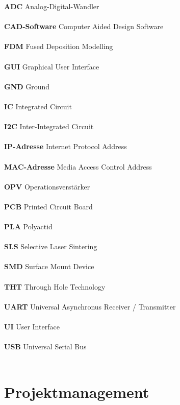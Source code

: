 \documentclass[titlepage,12pt,twoside]{article}
\begin{document}
{\large \textbf{ADC}} Analog-Digital-Wandler \\
\\
{\large \textbf{CAD-Software}} Computer Aided Design Software \\
\\
{\large \textbf{FDM}} Fused Deposition Modelling \\
\\
{\large \textbf{GUI}} Graphical User Interface \\
\\
{\large \textbf{GND}} Ground \\
\\
{\large \textbf{IC}} Integrated Circuit \\
\\
{\large \textbf{I2C}} Inter-Integrated Circuit \\
\\
{\large \textbf{IP-Adresse}} Internet Protocol Address \\
\\
{\large \textbf{MAC-Adresse}} Media Access Control Address \\
\\
{\large \textbf{OPV}} Operationsverstärker \\
\\
{\large \textbf{PCB}} Printed Circuit Board \\
\\
{\large \textbf{PLA}} Polyactid \\
\\
{\large \textbf{SLS}} Selective Laser Sintering \\
\\
{\large \textbf{SMD}} Surface Mount Device \\
\\
{\large \textbf{THT}} Through Hole Technology \\
\\
{\large \textbf{UART}} Universal Asynchronus Receiver / Transmitter \\
\\
{\large \textbf{UI}} User Interface \\
\\
{\large \textbf{USB}} Universal Serial Bus \\
\\

\newpage
\section{Projektmanagement}
\end{document}
